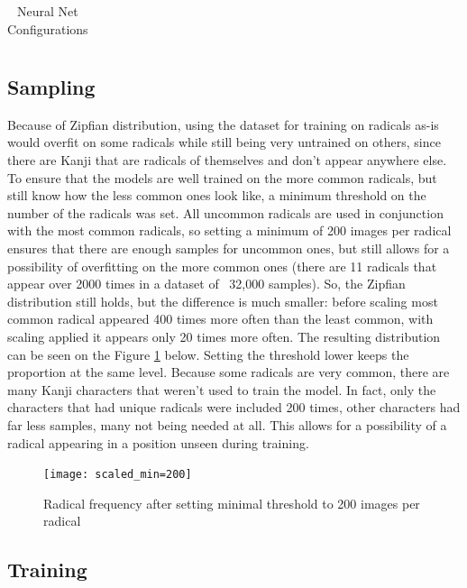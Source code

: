 \documentclass{article}
\begin{document}
\begin{CJK*}{UTF8}{min}
\begin{table}[h]
\begin{tabular}{|c|c|c|c|}
    \end{tabular}
    \caption{Neural Net Configurations}
    \label{tab:nets}
\end{table}

\subsection{Sampling}\label{sec:sampling}
Because of Zipfian distribution, using the dataset for training on radicals as-is would overfit on some radicals while still being very untrained on others, since there are Kanji that are radicals of themselves and don't appear anywhere else. To ensure that the models are well trained on the more common radicals, but still know how the less common ones look like, a minimum threshold on the number of the radicals was set. All uncommon radicals are used in conjunction with the most common radicals, so setting a minimum of 200 images per radical ensures that there are enough samples for uncommon ones, but still allows for a possibility of overfitting on the more common ones (there are 11 radicals that appear over 2000 times in a dataset of ~32,000 samples). So, the Zipfian distribution still holds, but the difference is much smaller: before scaling most common radical appeared 400 times more often than the least common, with scaling applied it appears only 20 times more often. The resulting distribution can be seen on the Figure \ref{fig:zipf_scaled} below. Setting the threshold lower keeps the proportion at the same level. Because some radicals are very common, there are many Kanji characters that weren't used to train the model. In fact, only the characters that had unique radicals were included 200 times, other characters had far less samples, many not being needed at all. This allows for a possibility of a radical appearing in a position unseen during training.

\begin{figure}[h]
    \centering
    \texttt{[image: scaled\_min=200]}
    \caption{Radical frequency after setting minimal threshold to 200 images per radical}
    \label{fig:zipf_scaled}
\end{figure}

\subsection{Training}


\end{CJK*}
\end{document}
